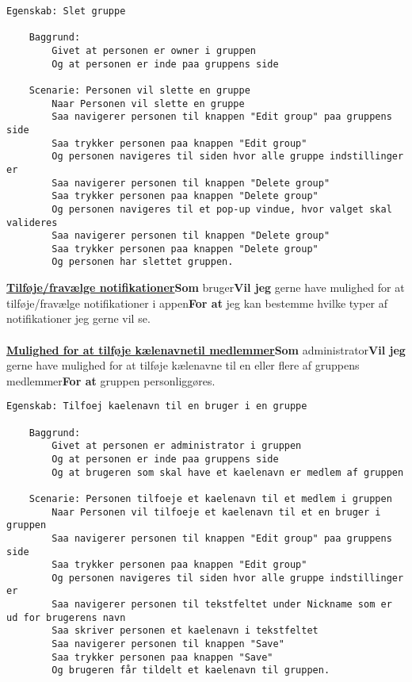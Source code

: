 \begin{lstlisting}[language=Gherkin]
Egenskab: Slet gruppe

    Baggrund:
        Givet at personen er owner i gruppen
        Og at personen er inde paa gruppens side
        
    Scenarie: Personen vil slette en gruppe
        Naar Personen vil slette en gruppe
        Saa navigerer personen til knappen "Edit group" paa gruppens side
        Saa trykker personen paa knappen "Edit group"
        Og personen navigeres til siden hvor alle gruppe indstillinger er
        Saa navigerer personen til knappen "Delete group"
        Saa trykker personen paa knappen "Delete group"
        Og personen navigeres til et pop-up vindue, hvor valget skal valideres
        Saa navigerer personen til knappen "Delete group"
        Saa trykker personen paa knappen "Delete group"
        Og personen har slettet gruppen.

\end{lstlisting}

\textbf{\underline{Tilføje/fravælge notifikationer}}\newline \textbf{Som} bruger\newline \textbf{Vil jeg} gerne have mulighed for at tilføje/fravælge notifikationer i appen\newline \textbf{For at} jeg kan bestemme hvilke typer af notifikationer jeg gerne vil se.  \\\\

\textbf{\underline{Mulighed for at tilføje kælenavne}}\newline \textbf{\underline{til medlemmer}}\newline \textbf{Som} administrator\newline \textbf{Vil jeg} gerne have mulighed for at tilføje kælenavne til en eller flere af gruppens medlemmer\newline \textbf{For at} gruppen personliggøres.

\begin{lstlisting}[language=Gherkin]
Egenskab: Tilfoej kaelenavn til en bruger i en gruppe

    Baggrund:
        Givet at personen er administrator i gruppen
        Og at personen er inde paa gruppens side
        Og at brugeren som skal have et kaelenavn er medlem af gruppen
        
    Scenarie: Personen tilfoeje et kaelenavn til et medlem i gruppen
        Naar Personen vil tilfoeje et kaelenavn til et en bruger i gruppen
        Saa navigerer personen til knappen "Edit group" paa gruppens side
        Saa trykker personen paa knappen "Edit group"
        Og personen navigeres til siden hvor alle gruppe indstillinger er
        Saa navigerer personen til tekstfeltet under Nickname som er ud for brugerens navn
        Saa skriver personen et kaelenavn i tekstfeltet
        Saa navigerer personen til knappen "Save"
        Saa trykker personen paa knappen "Save"
        Og brugeren får tildelt et kaelenavn til gruppen.

\end{lstlisting}

